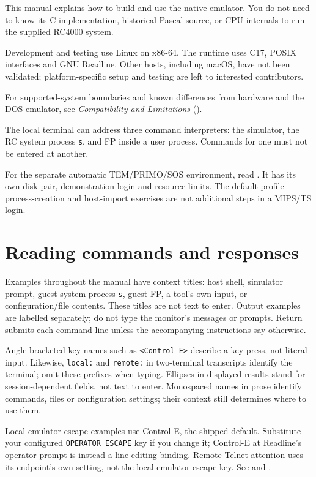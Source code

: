 This manual explains how to build and use the native emulator. You do not need to know its C implementation, historical Pascal source, or CPU internals to run the supplied RC4000 system.

Development and testing use Linux on x86-64. The runtime uses C17, POSIX interfaces and GNU Readline. Other hosts, including macOS, have not been validated; platform-specific setup and testing are left to interested contributors.

For supported-system boundaries and known differences from hardware and the DOS emulator, see \textit{Compatibility and Limitations} ().

The local terminal can address three command interpreters: the simulator, the RC system process \passthrough{\lstinline!s!}, and FP inside a user process. Commands for one must not be entered at another.

For the separate automatic TEM/PRIMO/SOS environment, read
. It has its own disk pair,
demonstration login and resource limits. The default-profile process-creation
and host-import exercises are not additional steps in a MIPS/TS login.

\section*{Reading commands and responses}

Examples throughout the manual have context titles: host shell,
simulator prompt, guest system process \texttt{s}, guest FP, a tool's own
input, or configuration/file contents. These titles
are not text to enter. Output examples are labelled separately; do not type
the monitor's messages or prompts. Return submits each command line unless
the accompanying instructions say otherwise.

Angle-bracketed key names such as \texttt{<Control-E>} describe a key press,
not literal input. Likewise, \texttt{local:} and \texttt{remote:} in
two-terminal transcripts identify the terminal; omit these prefixes when
typing. Ellipses in displayed results stand for session-dependent fields,
not text to enter. Monospaced names in prose identify commands, files or
configuration settings; their context still determines where to use them.

Local emulator-escape examples use Control-E, the shipped default. Substitute
your configured \texttt{OPERATOR ESCAPE} key if you change it; Control-E at
Readline's operator prompt is instead a line-editing binding. Remote Telnet
attention uses its endpoint's own setting, not the local emulator escape key.
See  and
.

